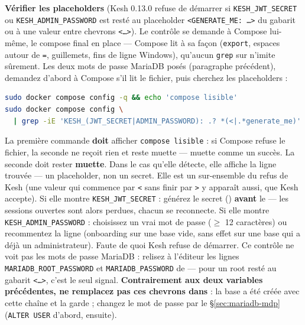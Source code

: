 \documentclass[a4paper,11pt,oneside]{article}
\begin{document}
\begin{sloppypar}
\textbf{Vérifier les placeholders} (Kesh 0.13.0 refuse de démarrer si \texttt{KESH\_JWT\_SECRET} ou \texttt{KESH\_ADMIN\_PASSWORD} est resté au placeholder \texttt{<GENERATE\_ME: …>} du gabarit ou à une valeur entre chevrons \texttt{<…>}). Le contrôle se demande à Compose lui-même, le compose final en place --- Compose lit  à sa façon (\texttt{export}, espaces autour de \texttt{=}, guillemets, fins de ligne Windows), qu'aucun \texttt{grep} sur  n'imite sûrement. Les deux mots de passe MariaDB posés (paragraphe précédent), demandez d'abord à Compose s'il lit le fichier, puis cherchez les placeholders :
\end{sloppypar}

\begin{lstlisting}[language=bash]
sudo docker compose config -q && echo 'compose lisible'
sudo docker compose config \
  | grep -iE 'KESH_(JWT_SECRET|ADMIN_PASSWORD): .? *(<|.*generate_me)'
\end{lstlisting}

\begin{sloppypar}
La première commande \textbf{doit} afficher \texttt{compose lisible} : si Compose refuse le fichier, la seconde ne reçoit rien et reste muette --- muette comme un succès. La seconde doit rester \textbf{muette}. Dans le cas qu'elle détecte, elle affiche la ligne trouvée --- un placeholder, non un secret. Elle est un sur-ensemble du refus de Kesh (une valeur qui commence par \texttt{<} sans finir par \texttt{>} y apparaît aussi, que Kesh accepte). Si elle montre \texttt{KESH\_JWT\_SECRET} : générez le secret () \textbf{avant} le  --- les sessions ouvertes sont alors perdues, chacun se reconnecte. Si elle montre \texttt{KESH\_ADMIN\_PASSWORD} : choisissez un vrai mot de passe ($\geq$ 12 caractères) ou recommentez la ligne (onboarding  sur une base vide, sans effet sur une base qui a déjà un administrateur). Faute de quoi Kesh refuse de démarrer. Ce contrôle ne voit pas les mots de passe MariaDB : relisez à l'éditeur les lignes \texttt{MARIADB\_ROOT\_PASSWORD} et \texttt{MARIADB\_PASSWORD} de  --- pour un root resté au gabarit \texttt{<…>}, c'est le seul signal. \textbf{Contrairement aux deux variables précédentes, ne remplacez pas ces chevrons dans } : la base a été créée avec cette chaîne et la garde ; changez le mot de passe par le \S\ref{sec:mariadb-mdp} (\texttt{ALTER USER} d'abord,  ensuite).
\end{sloppypar}
\end{document}
